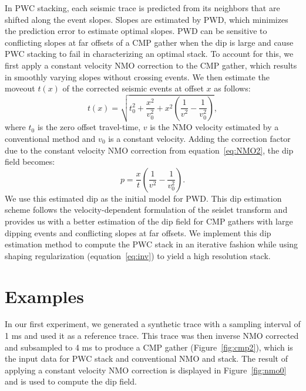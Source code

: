 In PWC stacking, each seismic trace is predicted from its neighbors that are shifted 
along the event slopes. Slopes are estimated by PWD, which minimizes the prediction error to estimate optimal slopes.
PWD can be sensitive to conflicting slopes at far offsets of a CMP gather when the dip is large and 
cause PWC stacking to fail in characterizing an optimal stack.
To account for this, we first apply a constant velocity NMO correction to the CMP gather, which results in 
smoothly varying slopes without crossing events. 
We then estimate the moveout $t(x)$ of the corrected seismic events at offset $x$ as follows:
\begin{equation} 
\label{eq:NMO2}
t(x) = \sqrt{t_{0}^{2}+\frac{x^{2}}{v_{0}^{2}} + x^{2} \left(\frac{1}{v^{2}} - \frac{1}{v_{0}^{2}}\right)},
\end{equation}
where $t_0$ is the zero offset travel-time, $v$ is the NMO velocity estimated by a conventional method 
and $v_0$ is a constant velocity.
Adding the correction factor due to the constant velocity NMO correction from equation~\ref{eq:NMO2}, the 
dip field becomes:
\begin{equation} 
\label{eq:dip2}
p={\frac{x}{t}}\left(\frac{1}{v^{2}}-\frac{1}{v_{0}^{2}}\right).
\end{equation}
We use this estimated dip as the initial model for PWD. 
This dip estimation scheme follows the velocity-dependent formulation of the seislet transform \cite[]{liu}
and provides us with a better estimation of the dip field for CMP gathers with large dipping events and conflicting slopes at 
far offsets. We implement this dip estimation method to compute the PWC stack in an iterative 
fashion while using shaping regularization (equation~\ref{eq:inv}) to yield a high resolution stack.

\section{Examples}
In our first experiment, we generated a synthetic trace with a sampling interval of 1 ms and 
used it as a reference trace. This trace was then inverse NMO corrected and subsampled to 4 ms 
to produce a CMP gather (Figure~\ref{fig:cmp2}), which is the input data for PWC stack and conventional NMO and stack.
The result of applying a constant velocity NMO correction is displayed in Figure~\ref{fig:nmo0} and is used to compute
the dip field.



